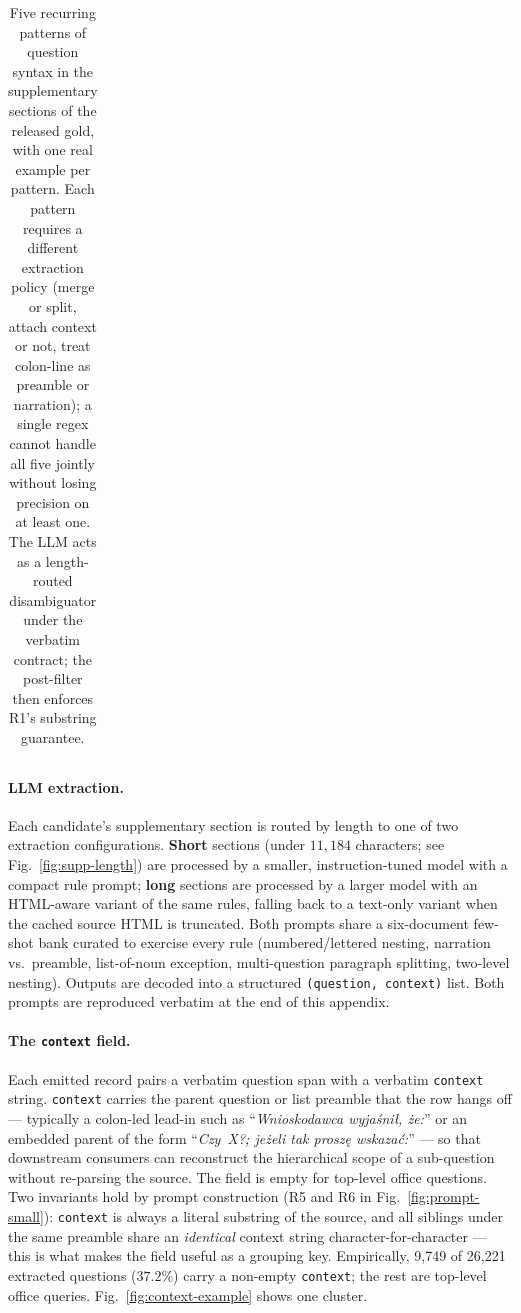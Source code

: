 \begin{table}[!htb]
\begin{tabularx}{\linewidth}{@{}lp{0.13\linewidth}XXp{0.22\linewidth}@{}}
\bottomrule
\end{tabularx}
\caption{Five recurring patterns of question syntax in the
supplementary sections of the released gold, with one real example
per pattern. Each pattern requires a different extraction policy
(merge or split, attach context or not, treat colon-line as preamble
or narration); a single regex cannot handle all five jointly without
losing precision on at least one. The LLM acts as a length-routed
disambiguator under the verbatim contract; the post-filter then
enforces R1's substring guarantee.}
\label{tab:question-patterns}
\end{table}

\paragraph{LLM extraction.}
Each candidate's supplementary section is routed by length to one of
two extraction configurations. \textbf{Short} sections (under
$11{,}184$ characters; see Fig.~\ref{fig:supp-length}) are
processed by a smaller, instruction-tuned model with a compact rule
prompt; \textbf{long} sections are processed by a larger model with an
HTML-aware variant of the same rules, falling back to a text-only
variant when the cached source HTML is truncated. Both prompts share
a six-document few-shot bank curated to exercise every rule
(numbered/lettered nesting, narration vs.\ preamble, list-of-noun
exception, multi-question paragraph splitting, two-level nesting).
Outputs are decoded into a structured \texttt{(question, context)}
list. Both prompts are reproduced verbatim at the end of this
appendix.

\paragraph{The \texttt{context} field.}
Each emitted record pairs a verbatim question span with a verbatim
\texttt{context} string. \texttt{context} carries the parent question
or list preamble that the row hangs off --- typically a colon-led
lead-in such as ``\textit{Wnioskodawca wyja\'sni\l{}, \.ze:}'' or an
embedded parent of the form ``\textit{Czy~X?; je\.zeli tak prosz\k{e}
wskaza\'c:}'' --- so that downstream consumers can reconstruct the
hierarchical scope of a sub-question without re-parsing the source.
The field is empty for top-level office questions. Two invariants
hold by prompt construction (R5 and R6 in
Fig.~\ref{fig:prompt-small}): \texttt{context} is always a literal
substring of the source, and all siblings under the same preamble
share an \emph{identical} context string character-for-character ---
this is what makes the field useful as a grouping key. Empirically,
9{,}749 of 26{,}221 extracted questions ($37.2\%$) carry a non-empty
\texttt{context}; the rest are top-level office queries.
Fig.~\ref{fig:context-example} shows one cluster.


